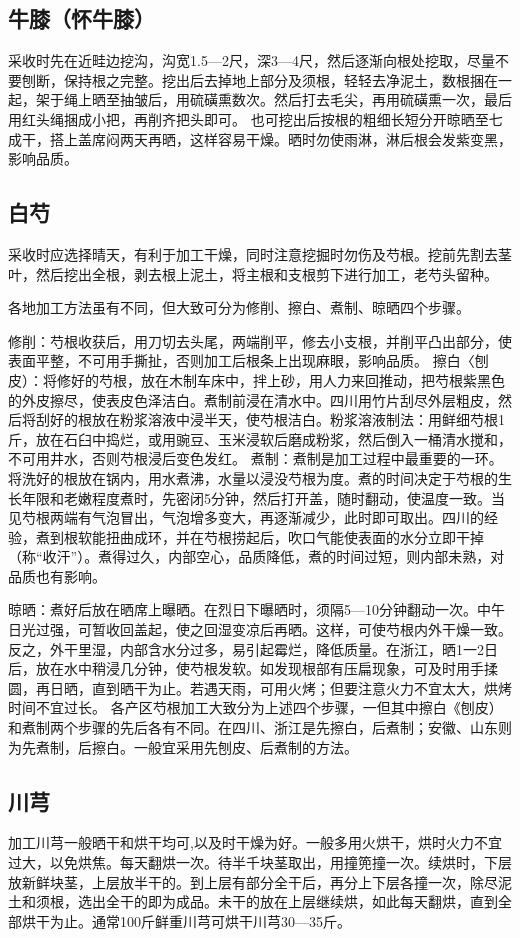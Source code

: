 \documentclass{ctexbook}
\begin{document}
\subsection{牛膝（怀牛膝）}
采收时先在近畦边挖沟，沟宽1.5—2尺，深3—4尺，然后逐渐向根处挖取，尽量不要刨断，保持根之完整。挖出后去掉地上部分及须根，轻轻去净泥土，数根捆在一起，架于绳上晒至抽皱后，用硫磺熏数次。然后打去毛尖，再用硫磺熏一次，最后用红头绳捆成小把，再削齐把头即可。
也可挖出后按根的粗细长短分开晾晒至七成干，搭上盖席闷两天再晒，这样容易干燥。晒时勿使雨淋，淋后根会发紫变黑，影响品质。
\subsection{白芍}
采收时应选择晴天，有利于加工干燥，同时注意挖掘时勿伤及芍根。挖前先割去茎叶，然后挖出全根，剥去根上泥土，将主根和支根剪下进行加工，老芍头留种。

各地加工方法虽有不同，但大致可分为修削、擦白、煮制、晾晒四个步骤。

修削：芍根收获后，用刀切去头尾，两端削平，修去小支根，并削平凸出部分，使表面平整，不可用手撕扯，否则加工后根条上出现麻眼，影响品质。
擦白〈刨皮）：将修好的芍根，放在木制车床中，拌上砂，用人力来回推动，把芍根紫黑色的外皮擦尽，使表皮色泽洁白。煮制前浸在清水中。四川用竹片刮尽外层粗皮，然后将刮好的根放在粉浆溶液中浸半天，使芍根洁白。粉浆溶液制法：用鲜细芍根1斤，放在石臼中捣烂，或用豌豆、玉米浸软后磨成粉浆，然后倒入一桶清水搅和，不可用井水，否则芍根浸后变色发红。
煮制：煮制是加工过程中最重要的一环。将洗好的根放在锅内，用水煮沸，水量以浸没芍根为度。煮的时间决定于芍根的生长年限和老嫩程度煮时，先密闭5分钟，然后打开盖，随时翻动，使温度一致。当见芍根两端有气泡冒出，气泡增多变大，再逐渐减少，此时即可取出。四川的经验，煮到根软能扭曲成环，并在芍根捞起后，吹口气能使表面的水分立即干掉（称“收汗”）。煮得过久，内部空心，品质降低，煮的时间过短，则内部未熟，对品质也有影响。

晾晒：煮好后放在晒席上曝晒。在烈日下曝晒时，须隔5—10分钟翻动一次。中午日光过强，可暂收回盖起，使之回湿变凉后再晒。这样，可使芍根内外干燥一致。反之，外干里湿，内部含水分过多，易引起霉烂，降低质量。在浙江，晒1一2日后，放在水中稍浸几分钟，使芍根发软。如发现根部有压扁现象，可及时用手揉圆，再日晒，直到晒干为止。若遇天雨，可用火烤；但要注意火力不宜太大，烘烤时间不宜过长。
各产区芍根加工大致分为上述四个步骤，一但其中擦白《刨皮）和煮制两个步骤的先后各有不同。在四川、浙江是先擦白，后煮制；安徽、山东则为先煮制，后擦白。一般宜采用先刨皮、后煮制的方法。

\subsection{川芎}
加工川芎一般晒干和烘干均可,以及时干燥为好。一般多用火烘干，烘时火力不宜过大，以免烘焦。每天翻烘一次。待半千块茎取出，用撞篼撞一次。续烘时，下层放新鲜块茎，上层放半干的。到上层有部分全干后，再分上下层各撞一次，除尽泥土和须根，选出全干的即为成品。未干的放在上层继续烘，如此每天翻烘，直到全部烘干为止。通常100斤鲜重川芎可烘干川芎30—35斤。
\end{document}
